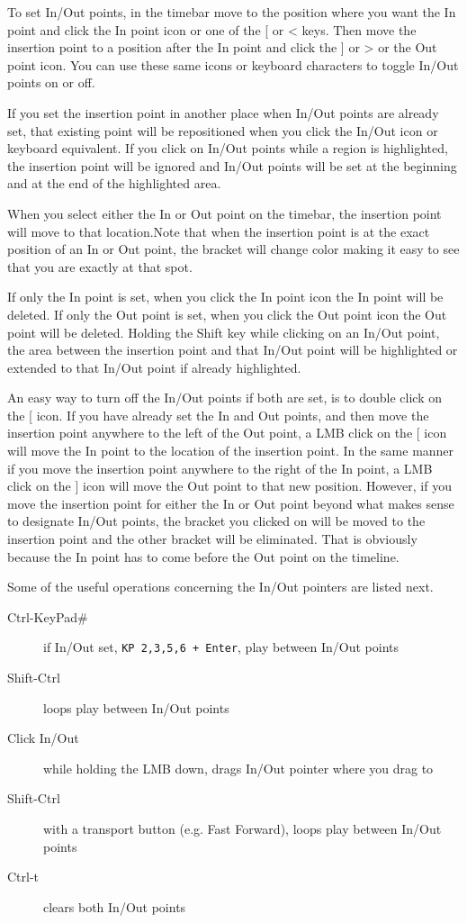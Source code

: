 To set In/Out points, in the timebar move to the position where you want the In point and click the In
point icon or one of the [ or < keys.
Then move the insertion point to a position after the In point and click the ] or > or the Out point icon. 
You can use these same icons or keyboard characters to toggle In/Out points on or off.

If you set the insertion point in another place when In/Out points are already set, that existing point will be
repositioned when you click the In/Out icon or keyboard equivalent. 
If you click on In/Out points while a region is highlighted, the insertion point will be ignored and In/Out points will be set at the beginning and at the end of the highlighted area.

When you select either the In or Out point on the timebar, the insertion point will move to that location.Note that when the insertion point is at the exact position of an In or Out point, the bracket will change
color making it easy to see that you are exactly at that spot.
 
If only the In point is set, when you click the In point icon the In point will be deleted. 
If only the Out point is set, when you click the Out point icon the Out point will be deleted. 
Holding the Shift key while clicking on an In/Out point, the area between the insertion point and that
In/Out point will be highlighted or extended to that In/Out point if already highlighted. 

An easy way to turn off the In/Out points if both are set, is to double click on the [ icon. 
If you have already set the In and Out points, and then move the insertion point anywhere to the left of
the Out point, a LMB click on the [ icon will move the In point to the location of the insertion point.  In the same
manner if you move the insertion point anywhere to the right of the In point, a LMB click on the ] icon
will move the Out point to that new position.  However, if you move the insertion point for either the
In or Out point beyond what makes sense to designate In/Out points, the bracket you clicked on will be
moved to the insertion point and the other bracket will be eliminated.  That is obviously because the
In point has to come before the Out point on the timeline.

Some of the useful operations concerning the In/Out pointers are listed next.

\begin{description}
    \item[Ctrl-KeyPad\#]  if In/Out set, \texttt{KP 2,3,5,6 + Enter}, play between In/Out points
    \item[Shift-Ctrl]  loops play between In/Out points
    \item[Click In/Out] while holding the LMB down, drags In/Out pointer where you drag to
    \item[Shift-Ctrl] with a transport button (e.g. Fast Forward), loops play between In/Out points
    \item[Ctrl-t]  clears both In/Out points
\end{description}

